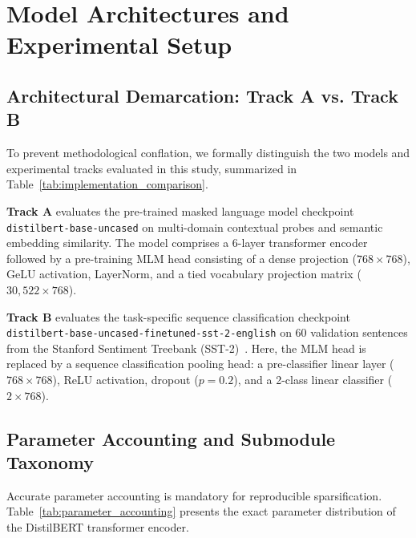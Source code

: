 \documentclass[conference]{IEEEtran}
\begin{document}


\section{Model Architectures and Experimental Setup}
\subsection{Architectural Demarcation: Track A vs. Track B}
To prevent methodological conflation, we formally distinguish the two models and experimental tracks evaluated in this study, summarized in Table~\ref{tab:implementation_comparison}.

\textbf{Track A} evaluates the pre-trained masked language model checkpoint \texttt{distilbert-base-uncased} on multi-domain contextual probes and semantic embedding similarity. The model comprises a 6-layer transformer encoder followed by a pre-training MLM head consisting of a dense projection ($768 \times 768$), GeLU activation, LayerNorm, and a tied vocabulary projection matrix ($30,522 \times 768$).

\textbf{Track B} evaluates the task-specific sequence classification checkpoint \texttt{distilbert-}\allowbreak\texttt{base-}\allowbreak\texttt{uncased-}\allowbreak\texttt{finetuned-}\allowbreak\texttt{sst-2-}\allowbreak\texttt{english} on 60 validation sentences from the Stanford Sentiment Treebank (SST-2)~\cite{socher2013recursive}. Here, the MLM head is replaced by a sequence classification pooling head: a pre-classifier linear layer ($768 \times 768$), ReLU activation, dropout ($p=0.2$), and a 2-class linear classifier ($2 \times 768$).

\subsection{Parameter Accounting and Submodule Taxonomy}
Accurate parameter accounting is mandatory for reproducible sparsification. Table~\ref{tab:parameter_accounting} presents the exact parameter distribution of the DistilBERT transformer encoder.


\end{document}
